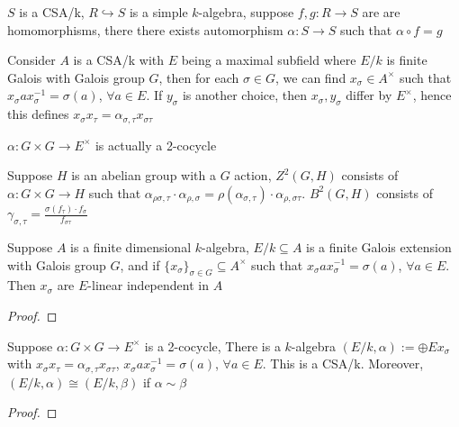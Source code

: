 \documentclass[a4paper,10pt]{article}
\begin{document}
\begin{theorem}
$S$ is a CSA/k, $R\hookrightarrow S$ is a simple $k$-algebra, suppose $f,g:R\to S$ are are homomorphisms, there there exists automorphism $\alpha:S\to S$ such that $\alpha\circ f=g$
\end{theorem}




Consider $A$ is a CSA/k with $E$ being a maximal subfield where $E/k$ is finite Galois with Galois group $G$, then for each $\sigma\in G$, we can find $x_\sigma\in A^\times$ such that $x_\sigma a x_\sigma^{-1}=\sigma(a)$, $\forall a\in E$. If $y_\sigma$ is another choice, then $x_\sigma,y_\sigma$ differ by $E^\times$, hence this defines $x_\sigma x_\tau=\alpha_{\sigma,\tau}x_{\sigma\tau}$

$\alpha:G\times G\to E^\times$ is actually a 2-cocycle

\begin{definition}
Suppose $H$ is an abelian group with a $G$ action, $Z^2(G,H)$ consists of $\alpha:G\times G\to H$ such that $\alpha_{\rho\sigma,\tau}\cdot\alpha_{\rho,\sigma}=\rho(\alpha_{\sigma,\tau})\cdot\alpha_{\rho,\sigma\tau}$. $B^2(G,H)$ consists of $\gamma_{\sigma,\tau}=\frac{\sigma(f_\tau)\cdot f_\sigma}{f_{\sigma\tau}}$
\end{definition}

\begin{lemma}
Suppose $A$ is a finite dimensional $k$-algebra, $E/k\subseteq A$ is a finite Galois extension with Galois group $G$, and if $\{x_\sigma\}_{\sigma\in G}\subseteq A^\times$ such that $x_\sigma a x_\sigma^{-1}=\sigma(a)$, $\forall a\in E$. Then $x_\sigma$ are $E$-linear independent in $A$
\end{lemma}

\begin{proof}

\end{proof}

\begin{proposition}
Suppose $\alpha:G\times G\to E^\times$ is a 2-cocycle, There is a $k$-algebra $(E/k,\alpha):=\oplus Ex_\sigma$ with $x_\sigma x_\tau=\alpha_{\sigma,\tau}x_{\sigma\tau}$, $x_\sigma a x_\sigma^{-1}=\sigma(a)$, $\forall a\in E$. This is a CSA/k. Moreover, $(E/k,\alpha)\cong (E/k,\beta)$ if $\alpha\sim\beta$
\end{proposition}

\begin{proof}

\end{proof}
\end{document}
